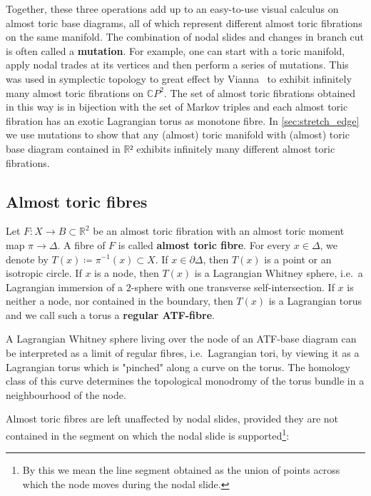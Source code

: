 \documentclass[12pt,a4paper,abstract=true,final]{scrartcl}
\begin{document}
Together, these three operations add up to an easy-to-use visual calculus on almost toric base diagrams, all of which represent different almost toric fibrations on the same manifold.
The combination of nodal slides and changes in branch cut is often called a \textbf{mutation}.
For example, one can start with a toric manifold, apply nodal trades at its vertices and then perform a series of mutations.
This was used in symplectic topology to great effect by Vianna~\cite{Via16} to exhibit infinitely many almost toric fibrations on $\mathbb{C}P^2$.
The set of almost toric fibrations obtained in this way is in bijection with the set of Markov triples and each almost toric fibration has an exotic Lagrangian torus as monotone fibre.
In \cref{sec:stretch_edge} we use mutations to show that any (almost) toric manifold with (almost) toric base diagram contained in $ℝ²$ exhibits infinitely many different almost toric fibrations.

\subsection{Almost toric fibres}
\label{sec:atfibres}

Let $F \colon X \rightarrow B \subset \mathbb{R}^2$ be an almost toric fibration with an almost toric moment map $\pi \to \Delta$.
A fibre of $F$ is called \textbf{almost toric fibre}.
For every $x \in \Delta$, we denote by $T(x) ≔ π^{-1}(x) \subset X$.
If $x \in \partial \Delta$, then $T(x)$ is a point or an isotropic circle.
If $x$ is a node, then $T(x)$ is a Lagrangian Whitney sphere, i.e.\ a Lagrangian immersion of a $2$-sphere with one transverse self-intersection.
If $x$ is neither a node, nor contained in the boundary, then $T(x)$ is a Lagrangian torus and we call such a torus a \textbf{regular ATF-fibre}.

\begin{remark}
    \label{rk:pinchedtorus}
    A Lagrangian Whitney sphere living over the node of an ATF-base diagram can be interpreted as a limit of regular fibres, i.e.\ Lagrangian tori, by viewing it as a Lagrangian torus which is "pinched" along a curve on the torus.
The homology class of this curve determines the topological monodromy of the torus bundle in a neighbourhood of the node.
\end{remark}

Almost toric fibres are left unaffected by nodal slides, provided they are not contained in the segment on which the nodal slide is supported\footnote{By this we mean the line segment obtained as the union of points across which the node moves during the nodal slide.}:
\end{document}
